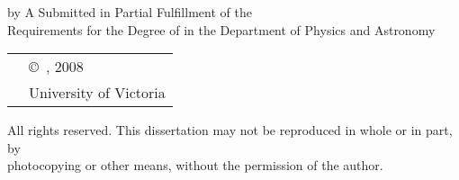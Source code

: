 \pagebreak
{
	\centering
	\thesistitle
	\tpbreak
	by
	\tpbreak
	\nameanddegrees
	\tpbreak
	A \PhDorMas Submitted in Partial Fulfillment of the \\
	Requirements for the Degree of
	\tpbreak
	\PhDorMaster
	\tpbreak
	in the Department of Physics and Astronomy\\
	\vfill
	\begin{tabular}{cl}
		& \copyright\ \yourname, 2008\\
		& \phantom{\copyright} University of Victoria
	\end{tabular}
	\tpbreak
	All rights reserved. This dissertation may not be reproduced in whole or in part, by \\
	\hfill photocopying or other means, without the permission of the author. 
	\hfill
}
\pagebreak
